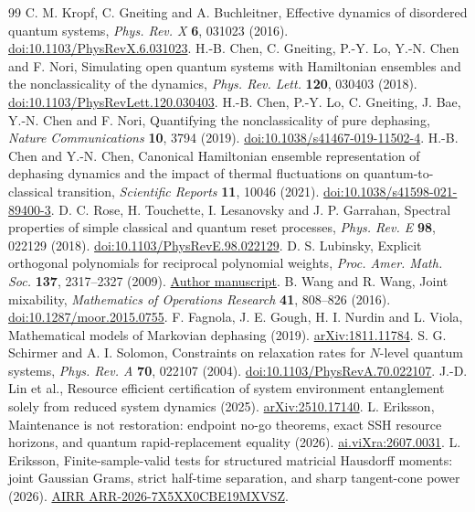 \documentclass[11pt,a4paper]{article}
\begin{document}
\begin{thebibliography}{99}
 C. M. Kropf, C. Gneiting and A. Buchleitner,
Effective dynamics of disordered quantum systems,
\emph{Phys. Rev. X} \textbf{6}, 031023 (2016).
\href{https://doi.org/10.1103/PhysRevX.6.031023}{doi:10.1103/PhysRevX.6.031023}.
 H.-B. Chen, C. Gneiting, P.-Y. Lo, Y.-N. Chen
and F. Nori, Simulating open quantum systems with Hamiltonian
ensembles and the nonclassicality of the dynamics,
\emph{Phys. Rev. Lett.} \textbf{120}, 030403 (2018).
\href{https://doi.org/10.1103/PhysRevLett.120.030403}{doi:10.1103/PhysRevLett.120.030403}.
 H.-B. Chen, P.-Y. Lo, C. Gneiting, J. Bae,
Y.-N. Chen and F. Nori, Quantifying the nonclassicality of pure
dephasing, \emph{Nature Communications} \textbf{10}, 3794 (2019).
\href{https://doi.org/10.1038/s41467-019-11502-4}{doi:10.1038/s41467-019-11502-4}.
 H.-B. Chen and Y.-N. Chen, Canonical Hamiltonian
ensemble representation of dephasing dynamics and the impact of
thermal fluctuations on quantum-to-classical transition,
\emph{Scientific Reports} \textbf{11}, 10046 (2021).
\href{https://doi.org/10.1038/s41598-021-89400-3}{doi:10.1038/s41598-021-89400-3}.
 D. C. Rose, H. Touchette, I. Lesanovsky and J. P.
Garrahan, Spectral properties of simple classical and quantum reset
processes, \emph{Phys. Rev. E} \textbf{98}, 022129 (2018).
\href{https://doi.org/10.1103/PhysRevE.98.022129}{doi:10.1103/PhysRevE.98.022129}.
 D. S. Lubinsky, Explicit orthogonal polynomials for
reciprocal polynomial weights, \emph{Proc. Amer. Math. Soc.}
\textbf{137}, 2317--2327 (2009).
\href{https://lubinsky.math.gatech.edu/Research%20papers/ExplicitOPAugust2008.pdf}{Author manuscript}.
 B. Wang and R. Wang, Joint mixability,
\emph{Mathematics of Operations Research} \textbf{41}, 808--826 (2016).
\href{https://doi.org/10.1287/moor.2015.0755}{doi:10.1287/moor.2015.0755}.
 F. Fagnola, J. E. Gough, H. I. Nurdin and L. Viola,
Mathematical models of Markovian dephasing (2019).
\href{https://arxiv.org/abs/1811.11784}{arXiv:1811.11784}.
 S. G. Schirmer and A. I. Solomon,
Constraints on relaxation rates for $N$-level quantum systems,
\emph{Phys. Rev. A} \textbf{70}, 022107 (2004).
\href{https://doi.org/10.1103/PhysRevA.70.022107}{doi:10.1103/PhysRevA.70.022107}.
 J.-D. Lin et al., Resource efficient certification of
system environment entanglement solely from reduced system dynamics
(2025). \href{https://arxiv.org/abs/2510.17140}{arXiv:2510.17140}.
 L. Eriksson, Maintenance is not
restoration: endpoint no-go theorems, exact SSH resource horizons,
and quantum rapid-replacement equality (2026).
\href{https://www.ai.vixra.org/abs/2607.0031}{ai.viXra:2607.0031}.
 L. Eriksson, Finite-sample-valid tests for
structured matricial Hausdorff moments: joint Gaussian Grams, strict
half-time separation, and sharp tangent-cone power (2026).
\href{https://airr.science/papers/ARR-2026-7X5XX0CBE19MXVSZ/}{AIRR ARR-2026-7X5XX0CBE19MXVSZ}.
\end{thebibliography}
\end{document}
